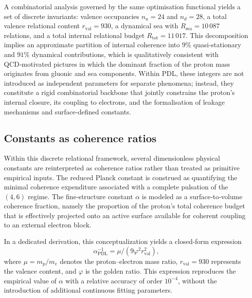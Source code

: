 \documentclass[11pt,a4paper]{article}
\begin{document}
A combinatorial analysis governed by the same optimisation functional yields a set of discrete invariants: valence occupancies $n_u = 24$ and $n_d = 28$, a total valence relational content $r_{\text{val}} = 930$, a dynamical sea with $R_{\text{sea}} = 10\,087$ relations, and a total internal relational budget $R_{\text{tot}} = 11\,017$.\cite{Laubscher2026CombinatorialProton} This decomposition implies an approximate partition of internal coherence into $9\%$ quasi‑stationary and $91\%$ dynamical contributions, which is qualitatively consistent with QCD‑motivated pictures in which the dominant fraction of the proton mass originates from gluonic and sea components.\cite{Laubscher2026FullPDL} Within PDL, these integers are not introduced as independent parameters for separate phenomena; instead, they constitute a rigid combinatorial backbone that jointly constrains the proton’s internal closure, its coupling to electrons, and the formalisation of leakage mechanisms and surface‑defined constants.\cite{Laubscher2026Alpha,Laubscher2026TopologicalReformulation}

\subsection{Constants as coherence ratios}
Within this discrete relational framework, several dimensionless physical constants are reinterpreted as coherence ratios rather than treated as primitive empirical inputs.\cite{Laubscher2026FullPDL} The reduced Planck constant is construed as quantifying the minimal coherence expenditure associated with a complete pulsation of the $(4,6)$ regime.\cite{Laubscher2026IntroPDL} The fine‑structure constant $\alpha$ is modeled as a surface‑to‑volume coherence fraction, namely the proportion of the proton’s total coherence budget that is effectively projected onto an active surface available for coherent coupling to an external electron block.\cite{Laubscher2026Alpha} 

In a dedicated derivation, this conceptualization yields a closed‑form expression
\[
\alpha^{-1}_{\mathrm{PDL}} = \mu / (9 \varphi^{2} r_{\mathrm{val}}^{2}),
\]
where $\mu = m_p/m_e$ denotes the proton–electron mass ratio, $r_{\mathrm{val}} = 930$ represents the valence content, and $\varphi$ is the golden ratio. This expression reproduces the empirical value of $\alpha$ with a relative accuracy of order $10^{-4}$, without the introduction of additional continuous fitting parameters.\cite{Laubscher2026Alpha,Laubscher2026GoldenRatioSurface} 
\end{document}
